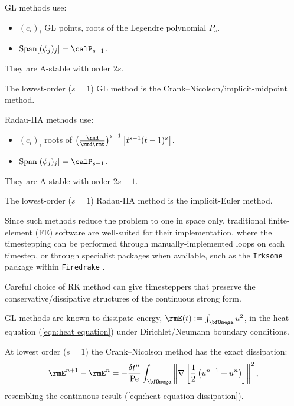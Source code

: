     \begin{example}
        GL methods use:
        \begin{itemize}
            \item  $(c_{i})_{i}$ GL points, roots of the Legendre polynomial $P_{s}$.
            \item  ${\rm Span}[(\phi_{j})_{j}]  =  \calP_{s - 1}$.
        \end{itemize}
        They are A-stable with order $2s$. \BA{[Ref]}

        The lowest-order ($s  =  1$) GL method is the Crank–Nicolson/implicit-midpoint method.
    \end{example}

    \begin{example}
        Radau-IIA methods use:
        \begin{itemize}
            \item  $(c_{i})_{i}$ roots of $\left(\frac{\rmd}{\rmd\rmt}\right)^{s - 1}\left[t^{s - 1}(t - 1)^{s}\right]$.
            \item  ${\rm Span}[(\phi_{j})_{j}]  =  \calP_{s - 1}$.
        \end{itemize}
        They are A-stable with order $2s - 1$. \BA{[Ref]}

        The lowest-order ($s  =  1$) Radau-IIA method is the implicit-Euler method.
    \end{example}
    \line
    
    Since such methods reduce the problem to one in space only, traditional finite-element (FE) software are well-suited for their implementation, where the timestepping can be performed through manually-implemented loops on each timestep, or through specialist packages when available, such as the \texttt{Irksome} package within \texttt{Firedrake} \BA{[Ref]}.

    Careful choice of RK method can give timesteppers that preserve the conservative/dissipative structures of the continuous strong form.

    \line
    
    \begin{example}
        GL methods are known to dissipate energy, $\rmE(t)  :=  \int_{\bfOmega}u^{2}$, in the heat equation (\ref{eqn:heat equation}) under Dirichlet/Neumann boundary conditions. \BA{[Ref]}
        
        At lowest order ($s  =  1$) the Crank–Nicolson method has the exact dissipation:
        \begin{equation}
            \rmE^{n + 1} - \rmE^{n}  =  - \frac{\delta t^{n}}{\rmPe}\int_{\bfOmega}\left\|\nabla\left[\frac{1}{2}\left(u^{n + 1} + u^{n}\right)\right]\right\|^{2},
        \end{equation}
        resembling the continuous result (\ref{eqn:heat equation dissipation}).
    \end{example}
    
